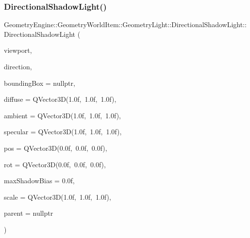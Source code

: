\subsubsection{\texorpdfstring{DirectionalShadowLight()}{DirectionalShadowLight()}\hspace{0.1cm}{\footnotesize\ttfamily [1/2]}}
{\footnotesize\ttfamily Geometry\+Engine\+::\+Geometry\+World\+Item\+::\+Geometry\+Light\+::\+Directional\+Shadow\+Light\+::\+Directional\+Shadow\+Light (\begin{DoxyParamCaption}\item[{const \mbox{\hyperlink{class_geometry_engine_1_1_geometry_item_utils_1_1_viewport}{Geometry\+Item\+Utils\+::\+Viewport}} \&}]{viewport,  }\item[{const Q\+Vector3D \&}]{direction,  }\item[{\mbox{\hyperlink{class_geometry_engine_1_1_geometry_world_item_1_1_geometry_item_1_1_geometry_item}{Geometry\+Item\+::\+Geometry\+Item}} $\ast$}]{bounding\+Box = {\ttfamily nullptr},  }\item[{const Q\+Vector3D \&}]{diffuse = {\ttfamily QVector3D(1.0f,~1.0f,~1.0f)},  }\item[{const Q\+Vector3D \&}]{ambient = {\ttfamily QVector3D(1.0f,~1.0f,~1.0f)},  }\item[{const Q\+Vector3D \&}]{specular = {\ttfamily QVector3D(1.0f,~1.0f,~1.0f)},  }\item[{const Q\+Vector3D \&}]{pos = {\ttfamily QVector3D(0.0f,~0.0f,~0.0f)},  }\item[{const Q\+Vector3D \&}]{rot = {\ttfamily QVector3D(0.0f,~0.0f,~0.0f)},  }\item[{float}]{max\+Shadow\+Bias = {\ttfamily 0.0f},  }\item[{const Q\+Vector3D \&}]{scale = {\ttfamily QVector3D(1.0f,~1.0f,~1.0f)},  }\item[{\mbox{\hyperlink{class_geometry_engine_1_1_geometry_world_item_1_1_world_item}{World\+Item}} $\ast$}]{parent = {\ttfamily nullptr} }\end{DoxyParamCaption})}

